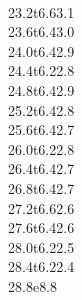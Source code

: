 {\\{23.2}t{6.6}{3.1}
\\{23.6}t{6.4}{3.0}
\\{24.0}t{6.4}{2.9}
\\{24.4}t{6.2}{2.8}
\\{24.8}t{6.4}{2.9}
\\{25.2}t{6.4}{2.8}
\\{25.6}t{6.4}{2.7}
\\{26.0}t{6.2}{2.8}
\\{26.4}t{6.4}{2.7}
\\{26.8}t{6.4}{2.7}
\\{27.2}t{6.6}{2.6}
\\{27.6}t{6.4}{2.6}
\\{28.0}t{6.2}{2.5}
\\{28.4}t{6.2}{2.4}
\\{28.8}e{8.8}}




